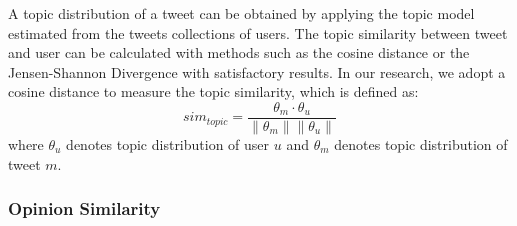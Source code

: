 \documentclass[letterpaper]{article}
\begin{document}
A topic distribution of a tweet can be obtained by applying the topic model estimated from the tweets collections of users.
The topic similarity between tweet and user can be calculated with methods such as the cosine distance \cite{cha2007comprehensive} or the Jensen-Shannon Divergence \cite{weng2010twitterrank} with satisfactory results.
In our research, we adopt a cosine distance to measure the topic similarity, which is defined as:
\begin{equation}
sim_{topic}=\dfrac{\theta_{m} \cdot \theta_{u}}{\parallel \theta_{m} \parallel \parallel \theta_{u} \parallel}
\end{equation}
where $ \theta_{u}$ denotes topic distribution of user $ u $ and $\theta_{m}$ denotes topic distribution of tweet $ m $. 

\subsubsection{Opinion Similarity}
\label{opsim}
\end{document}
